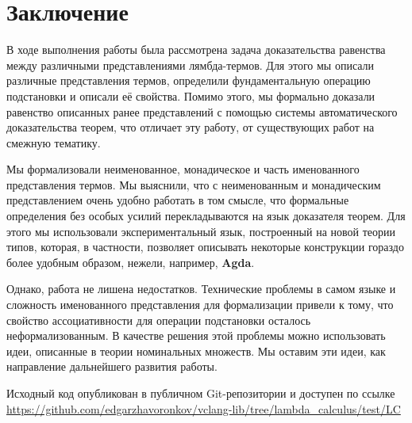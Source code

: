 \section*{Заключение}

В ходе выполнения работы была рассмотрена задача доказательства равенства между различными представлениями лямбда-термов. Для этого мы описали различные представления термов, определили фундаментальную операцию подстановки и описали её свойства. Помимо этого, мы формально доказали равенство описанных ранее представлений с помощью системы автоматического доказательства теорем, что отличает эту работу, от существующих работ на смежную тематику.

Мы формализовали неименованное, монадическое и часть именованного представления термов. Мы выяснили, что с неименованным и монадическим представлением очень удобно работать в том смысле, что формальные определения без особых усилий перекладываются на язык доказателя теорем. Для этого мы использовали экспериментальный язык, построенный на новой теории типов, которая, в частности, позволяет описывать некоторые конструкции гораздо более удобным образом, нежели, например, \textbf{Agda}.

Однако, работа не лишена недостатков. Технические проблемы в самом языке и сложность именованного представления для формализации привели к тому, что свойство ассоциативности для операции подстановки осталось неформализованным. В качестве решения этой проблемы можно использовать идеи, описанные в теории номинальных множеств. Мы оставим эти идеи, как направление дальнейшего развития работы.

Исходный код опубликован в публичном Git-репозитории и доступен по ссылке \url{https://github.com/edgarzhavoronkov/vclang-lib/tree/lambda_calculus/test/LC}
